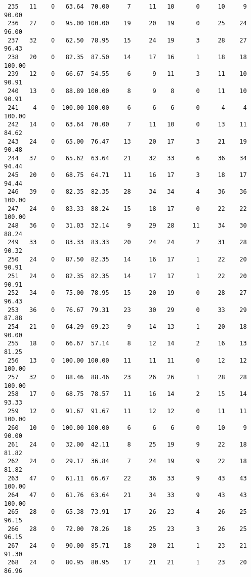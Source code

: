 \begin{verbatim}
 235   11    0   63.64  70.00     7     11   10      0     10     9    90.00
 236   27    0   95.00 100.00    19     20   19      0     25    24    96.00
 237   32    0   62.50  78.95    15     24   19      3     28    27    96.43
 238   20    0   82.35  87.50    14     17   16      1     18    18   100.00
 239   12    0   66.67  54.55     6      9   11      3     11    10    90.91
 240   13    0   88.89 100.00     8      9    8      0     11    10    90.91
 241    4    0  100.00 100.00     6      6    6      0      4     4   100.00
 242   14    0   63.64  70.00     7     11   10      0     13    11    84.62
 243   24    0   65.00  76.47    13     20   17      3     21    19    90.48
 244   37    0   65.62  63.64    21     32   33      6     36    34    94.44
 245   20    0   68.75  64.71    11     16   17      3     18    17    94.44
 246   39    0   82.35  82.35    28     34   34      4     36    36   100.00
 247   24    0   83.33  88.24    15     18   17      0     22    22   100.00
 248   36    0   31.03  32.14     9     29   28     11     34    30    88.24
 249   33    0   83.33  83.33    20     24   24      2     31    28    90.32
 250   24    0   87.50  82.35    14     16   17      1     22    20    90.91
 251   24    0   82.35  82.35    14     17   17      1     22    20    90.91
 252   34    0   75.00  78.95    15     20   19      0     28    27    96.43
 253   36    0   76.67  79.31    23     30   29      0     33    29    87.88
 254   21    0   64.29  69.23     9     14   13      1     20    18    90.00
 255   18    0   66.67  57.14     8     12   14      2     16    13    81.25
 256   13    0  100.00 100.00    11     11   11      0     12    12   100.00
 257   32    0   88.46  88.46    23     26   26      1     28    28   100.00
 258   17    0   68.75  78.57    11     16   14      2     15    14    93.33
 259   12    0   91.67  91.67    11     12   12      0     11    11   100.00
 260   10    0  100.00 100.00     6      6    6      0     10     9    90.00
 261   24    0   32.00  42.11     8     25   19      9     22    18    81.82
 262   24    0   29.17  36.84     7     24   19      9     22    18    81.82
 263   47    0   61.11  66.67    22     36   33      9     43    43   100.00
 264   47    0   61.76  63.64    21     34   33      9     43    43   100.00
 265   28    0   65.38  73.91    17     26   23      4     26    25    96.15
 266   28    0   72.00  78.26    18     25   23      3     26    25    96.15
 267   24    0   90.00  85.71    18     20   21      1     23    21    91.30
 268   24    0   80.95  80.95    17     21   21      1     23    20    86.96

\end{verbatim}
